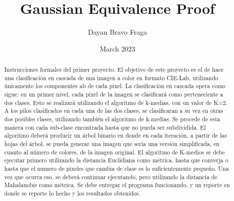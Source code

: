 \documentclass[24pt]{article}
\begin{document}
    \title{Gaussian Equivalence Proof}
    \author{Dayan Bravo Fraga}
    \date{March 2023}
    \maketitle

    \begin{abstract}
        Instrucciones formales del primer proyecto.
        El objetivo de este proyecto es el de hace una clasificación en cascada de una imagen a color en formato CIE-Lab,
        utilizando únicamente los componentes ab de cada pixel.
        La clasificación en cascada opera como sigue: en un primer nivel,
        cada pixel de la imagen se clasificará como perteneciente a dos clases.
        Esto se realizará utilizando el algoritmo de k-medias, con un valor de K=2.
        A los pilos clasificados en cada una de las dos clases, se clasificaran a su vez en otras dos posibles clases,
        utilizando también el algoritmo de k-medias.
        Se procede de esta manera con cada sub-clase encontrada hasta que no pueda ser subdividida.
        El algoritmo deberá producir un árbol binario en donde en cada iteración, a partir de las hojas del árbol,
        se pueda generar una imagen que sería una versión simplificada,
        en cuanto al número de colores, de la imagen original.
        El algoritmo de K-medios se debe ejecutar primero utilizando la distancia Euclidiana como métrica,
        hasta que converja o hasta que el numero de pixeles que cambia de clase es lo suficientemente pequeño.
        Una vez que ocurra eso, se deberá continuar ejecutando, pero utilizando la distancia de Mahalanobis como métrica.
        Se debe entregar el programa funcionando, y un reporte en donde se reporte lo hecho y los resultados obtenidos.
    \end{abstract}
\end{document}
